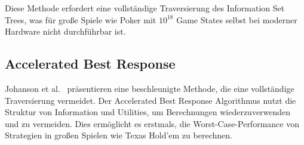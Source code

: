 Diese Methode erfordert eine vollständige Traversierung des Information Set Trees, was für große Spiele wie Poker mit $10^{18}$ Game States selbst bei moderner Hardware nicht durchführbar ist.

\subsection{Accelerated Best Response}

Johanson et al.~\cite{johanson2011accelerating} präsentieren eine beschleunigte Methode, die eine vollständige Traversierung vermeidet.
Der Accelerated Best Response Algorithmus nutzt die Struktur von Information und Utilities, um Berechnungen wiederzuverwenden und zu vermeiden.
Dies ermöglicht es erstmals, die Worst-Case-Performance von Strategien in großen Spielen wie Texas Hold'em zu berechnen.





